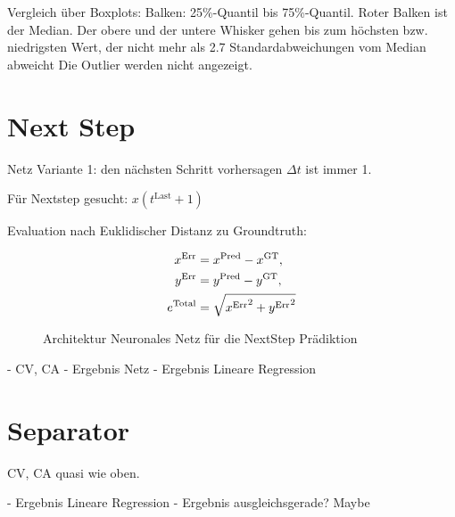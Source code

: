Vergleich über Boxplots: Balken: 25\%-Quantil bis 75\%-Quantil.
Roter Balken ist der Median. Der obere und der untere Whisker 
gehen bis zum höchsten bzw. niedrigsten Wert, der nicht mehr als 2.7 Standardabweichungen vom Median abweicht
Die Outlier werden nicht angezeigt.


\section{Next Step}

Netz Variante 1: den nächsten Schritt vorhersagen
\(\Delta t \) ist immer 1.


Für Nextstep gesucht: \(x(t^{\text{Last}} + 1)\)



Evaluation nach Euklidischer Distanz zu Groundtruth:

\begin{align*}
    x{^{\text{Err}}} &= x{^{\text{Pred}}} - x{^{\text{GT}}}, \\
    y{^{\text{Err}}} &= y{^{\text{Pred}}} - y{^{\text{GT}}}, \\
    e{^{\text{Total}}} &= \sqrt{x{^{\text{Err}}}^2 + y{^{\text{Err}}}^2}
\end{align*}


\begin{figure}
    \centering
	\caption{Architektur Neuronales Netz für die NextStep Prädiktion}
	\label{fig:boxplotErrorNNnextStep}
\end{figure}

- CV, CA
- Ergebnis Netz
- Ergebnis Lineare Regression


\section{Separator}

CV, CA quasi wie oben.


- Ergebnis Lineare Regression
- Ergebnis ausgleichsgerade? Maybe
